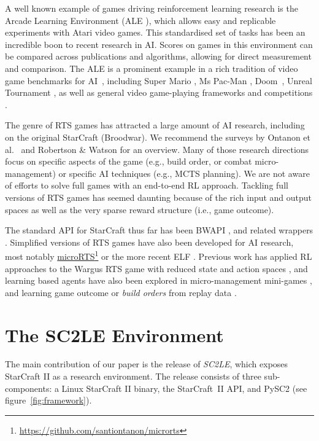 A well known example of games driving reinforcement learning research is the Arcade Learning Environment (ALE \cite{bellemare2013arcade}), which allows easy and replicable experiments with Atari video games.  This standardised set of tasks has been an incredible boon to recent research in AI.  Scores on games in this environment can be compared across publications and algorithms, allowing for direct measurement and comparison. The ALE is a prominent example in a rich tradition of video game benchmarks for AI~\cite{measuring:2011}, including Super Mario \cite{supermario}, Ms Pac-Man \cite{rohlfshagen2011ms}, Doom~\cite{vizdoom}, Unreal Tournament \cite{hingston2009turing}, as well as general video game-playing frameworks \cite{schaul2013video,bhonker2016playing} and competitions \cite{perez20152014}.

The genre of RTS games has attracted a large amount of AI research, including on the original StarCraft (Broodwar). We recommend the surveys by Ontanon et al.~\cite{ontanon2013survey} and  Robertson \& Watson \cite{robertson2014review} for an overview. Many of those research directions focus on specific aspects of the game (e.g., build order, or combat micro-management) or specific AI techniques (e.g., MCTS planning). We are not aware of efforts to solve full games with an end-to-end RL approach. Tackling full versions of RTS games has seemed daunting because of the rich input and output spaces as well as the very sparse reward structure (i.e., game outcome).

The standard API for StarCraft thus far has been BWAPI \cite{BWAPI}, and related wrappers   \cite{synnaeve2016torchcraft}. Simplified versions of RTS games have also been developed for AI research, most notably \href{https://github.com/santiontanon/microrts}{microRTS}\footnote{\url{https://github.com/santiontanon/microrts}} or the more recent ELF \cite{tian2017elf}. Previous work has applied RL approaches to the Wargus RTS game with reduced state and action spaces \cite{jaidee2012classq}, and learning based agents have also been explored in micro-management mini-games \cite{peng2017multiagent, usunier2016episodic}, and learning game outcome or \emph{build orders} from replay data \cite{erickson2014global,justesen2017learning}.

\section{The SC2LE Environment}\label{sec:env}

The main contribution of our paper is the release of \emph{SC2LE}, which exposes StarCraft II as a research environment. The release consists of three sub-components: a Linux StarCraft II binary, the StarCraft~II API, and PySC2 (see figure~\ref{fig:framework}).

